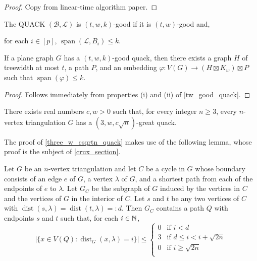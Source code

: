 \documentclass{patmorin}
\newcommand{\defin}[1]{\emph{\textcolor{brightmaroon}{#1}}}
\DeclareMathOperator{\spn}{span}
\DeclareMathOperator{\dist}{dist}
\begin{document}
\begin{proof}
  Copy from linear-time algorithm paper.
\end{proof}

The QUACK $(\mathcal{B},\mathcal{L})$ is $(t,w,k)$-good if it is $(t,w)$-good and,
\begin{compactenum}[({good-}a)]\setcounter{enumi}{18}
  \item for each $i\in[p]$, $\spn(\mathcal{L},B_i)\le k$.
\end{compactenum}

\begin{lem}
  If a plane graph $G$ has a $(t,w,k)$-good quack, then there exists a graph $H$ of treewidth at most $t$, a path $P$, and an embedding $\varphi:V(G)\to (H\boxtimes K_w)\boxtimes P$ such that $\spn(\varphi)\le k$.
\end{lem}

\begin{proof}
  Follows immediately from properties (i) and (ii) of \cref{tw_good_quack}.
\end{proof}






\begin{thm}\label{three_w_csqrtn_quack}
  There exists real numbers $c,w>0$ such that, for every integer $n\ge 3$, every $n$-vertex triangulation $G$ has a $(3,w,c\sqrt{n})$-great quack.
\end{thm}


The proof of \cref{three_w_csqrtn_quack} makes use of the following lemma, whose proof is the subject of \cref{crux_section}.

\begin{lem}\label{awesome_path}
  Let $G$ be an $n$-vertex triangulation and let $C$ be a cycle in $G$ whose boundary consists of an edge $e$ of $G$, a vertex $\lambda$ of $G$, and a shortest path from each of the endpoints of $e$ to $\lambda$.  Let $G_C$ be the subgraph of $G$ induced by the vertices in $C$ and the vertices of $G$ in the interior of $C$.  Let $s$ and $t$ be any two vertices of $C$ with $\dist(s,\lambda)=\dist(t,\lambda)=:d$.  Then $G_C$ contains a path $Q$ with endpoints $s$ and $t$ such that, for each $i\in\mathbb{N}$,
    \[  |\{x\in V(Q):\dist_G(x,\lambda)=i\}| \le
      \begin{cases}
        0 & \text{if $i < d$} \\
        3 & \text{if $d\le i < i+\sqrt{2n}$} \\
        0 & \text{if $i \ge \sqrt{2n}$} \\
      \end{cases}
    \]
\end{lem}
\end{document}
